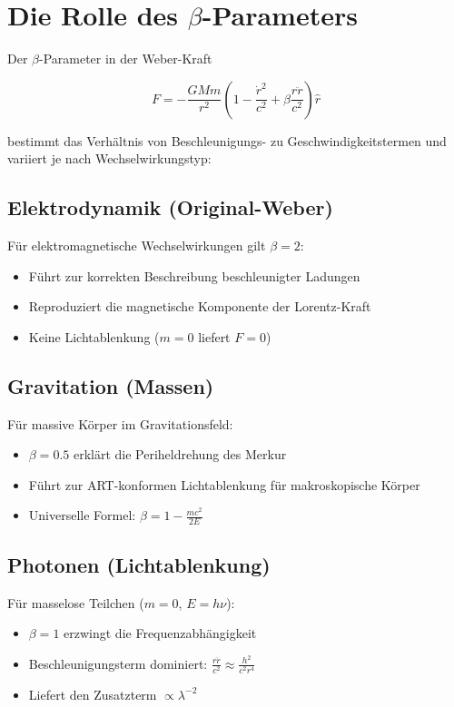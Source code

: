 \section{Die Rolle des $\beta$-Parameters}
\label{sec:beta_parameter}

Der $\beta$-Parameter in der Weber-Kraft

\begin{equation}
F = -\frac{GMm}{r^2}\left(1 - \frac{\dot{r}^2}{c^2} + \beta\frac{r\ddot{r}}{c^2}\right)\hat{r}
\end{equation}

bestimmt das Verhältnis von Beschleunigungs- zu Geschwindigkeitstermen und variiert je nach Wechselwirkungstyp:

\subsection{Elektrodynamik (Original-Weber)}
Für elektromagnetische Wechselwirkungen gilt $\beta=2$:
\begin{itemize}
\item Führt zur korrekten Beschreibung beschleunigter Ladungen
\item Reproduziert die magnetische Komponente der Lorentz-Kraft
\item Keine Lichtablenkung ($m=0$ liefert $F=0$)
\end{itemize}

\subsection{Gravitation (Massen)}
Für massive Körper im Gravitationsfeld:
\begin{itemize}
\item $\beta=0.5$ erklärt die Periheldrehung des Merkur
\item Führt zur ART-konformen Lichtablenkung für makroskopische Körper
\item Universelle Formel: $\beta = 1 - \frac{mc^2}{2E}$
\end{itemize}

\subsection{Photonen (Lichtablenkung)}
Für masselose Teilchen ($m=0$, $E=h\nu$):
\begin{itemize}
\item $\beta=1$ erzwingt die Frequenzabhängigkeit
\item Beschleunigungsterm dominiert: $\frac{r\ddot{r}}{c^2} \approx \frac{h^2}{c^2r^4}$
\item Liefert den Zusatzterm $\propto \lambda^{-2}$
\end{itemize}


